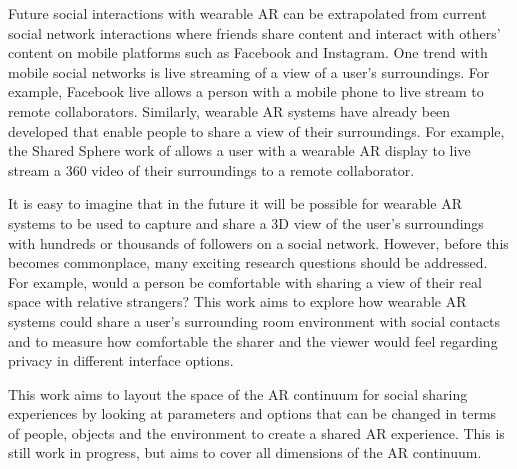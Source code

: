 Future social interactions with wearable AR can be extrapolated from current social network interactions where friends share content and interact with others' content on mobile platforms such as Facebook and Instagram. One trend with mobile social networks is live streaming of a view of a user’s surroundings. For example, Facebook live allows a person with a mobile phone to live stream to remote collaborators. Similarly, wearable AR systems have already been developed that enable people to share a view of their surroundings. For example, the Shared Sphere work of \cite{lee2017mixed} allows a user with a wearable AR display to live stream a 360 video of their surroundings to a remote collaborator. 

It is easy to imagine that in the future it will be possible for wearable AR systems to be used to capture and share a 3D view of the user's surroundings with hundreds or thousands of followers on a social network. However, before this becomes commonplace, many exciting research questions should be addressed. For example, would a person be comfortable with sharing a view of their real space with relative strangers? This work aims to explore how wearable AR systems could share a user’s surrounding room environment with social contacts and to measure how comfortable the sharer and the viewer would feel regarding privacy in different interface options. 



This work aims to layout the space of the AR continuum for social sharing experiences by looking at parameters and options that can be changed in terms of people, objects and the environment to create a shared AR experience. This is still work in progress, but aims to cover all dimensions of the AR continuum.





